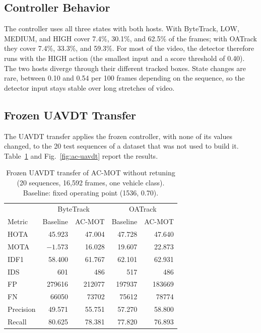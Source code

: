 \subsection{Controller Behavior}\label{sec:ac-res-behavior}
The controller uses all three states with both hosts. With ByteTrack, LOW, MEDIUM, and HIGH cover 7.4\%, 30.1\%, and 62.5\% of the frames; with OATrack they cover 7.4\%, 33.3\%, and 59.3\%. For most of the video, the detector therefore runs with the HIGH action (the smallest input and a score threshold of 0.40). The two hosts diverge through their different tracked boxes. State changes are rare, between 0.10 and 0.54 per 100 frames depending on the sequence, so the detector input stays stable over long stretches of video.

\subsection{Frozen UAVDT Transfer}\label{sec:ac-res-uavdt}
The UAVDT transfer applies the frozen controller, with none of its values changed, to the 20 test sequences of a dataset that was not used to build it. Table~\ref{tab:ac-uavdt} and Fig.~\ref{fig:ac-uavdt} report the results.

\begin{table}[tbp]
\centering
\caption{Frozen UAVDT transfer of AC-MOT without retuning (20 sequences, 16,592 frames, one vehicle class). Baseline: fixed operating point (1536, 0.70).}
\label{tab:ac-uavdt}
\begin{tabular}{lrrrr}
\toprule
 & \multicolumn{2}{c}{ByteTrack} & \multicolumn{2}{c}{OATrack}\\
Metric & Baseline & AC-MOT & Baseline & AC-MOT\\
\midrule
HOTA & 45.923 & 47.004 & 47.728 & 47.640\\
MOTA & $-1.573$ & 16.028 & 19.607 & 22.873\\
IDF1 & 58.400 & 61.767 & 62.101 & 62.931\\
IDS & 601 & 486 & 517 & 486\\
FP & 279616 & 212077 & 197937 & 183669\\
FN & 66050 & 73702 & 75612 & 78774\\
Precision & 49.571 & 55.751 & 57.270 & 58.800\\
Recall & 80.625 & 78.381 & 77.820 & 76.893\\
\bottomrule
\end{tabular}
\end{table}

